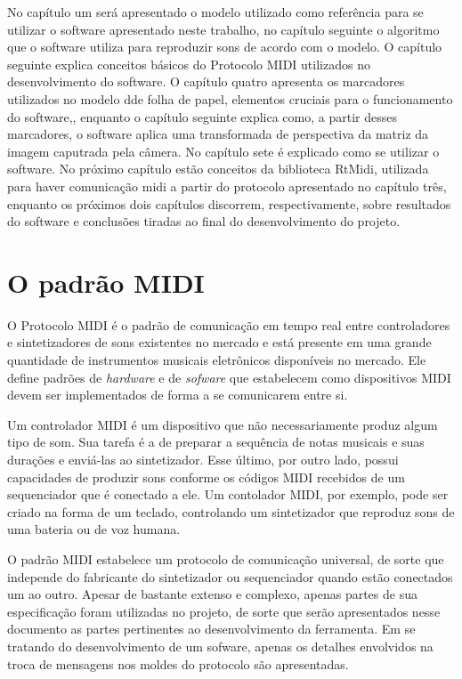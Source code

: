 \documentclass[12pt]{report}
\begin{document}
No capítulo um será apresentado o modelo utilizado como referência
para se utilizar o software apresentado neste trabalho, no capítulo
seguinte o algoritmo que o software utiliza para reproduzir sons de
acordo com o modelo. O capítulo seguinte explica conceitos básicos do
Protocolo MIDI utilizados no desenvolvimento do software. O capítulo
quatro apresenta os marcadores utilizados no modelo dde folha de
papel, elementos cruciais para o funcionamento do software,, enquanto
o capítulo seguinte explica como, a partir desses marcadores, o
software aplica uma transformada de perspectiva da matriz da imagem
caputrada pela câmera. No capítulo sete é explicado como se utilizar o
software. No próximo capítulo estão conceitos da biblioteca RtMidi,
utilizada para haver comunicação midi a partir do protocolo
apresentado no capítulo três, enquanto os próximos dois capítulos
discorrem, respectivamente, sobre resultados do software e conclusões
tiradas ao final do desenvolvimento do projeto.

\chapter{O padrão MIDI}
\label{cha:midi}

O Protocolo MIDI\cite{midi} é o padrão de comunicação em tempo real
entre controladores e sintetizadores de sons existentes no mercado e
está presente em uma grande quantidade de instrumentos musicais
eletrônicos disponíveis no mercado. Ele define padrões de {\it
  hardware} e de {\it sofware} que estabelecem como dispositivos MIDI
devem ser implementados de forma a se comunicarem entre si.

Um controlador MIDI é um dispositivo que não necessariamente produz
algum tipo de som. Sua tarefa é a de preparar a sequência de notas
musicais e suas durações e enviá-las ao sintetizador. Esse último, por
outro lado, possui capacidades de produzir sons conforme os códigos
MIDI recebidos de um sequenciador que é conectado a ele. Um contolador
MIDI, por exemplo, pode ser criado na forma de um teclado, controlando
um sintetizador que reproduz sons de uma bateria ou de voz humana.

O padrão MIDI estabelece um protocolo de comunicação universal, de
sorte que independe do fabricante do sintetizador ou sequenciador
quando estão conectados um ao outro. Apesar de bastante extenso e
complexo, apenas partes de sua especificação foram utilizadas no
projeto, de sorte que serão apresentados nesse documento as partes
pertinentes ao desenvolvimento da ferramenta. Em se tratando do
desenvolvimento de um sofware, apenas os detalhes envolvidos na
troca de mensagens nos moldes do protocolo são apresentadas.
\end{document}
